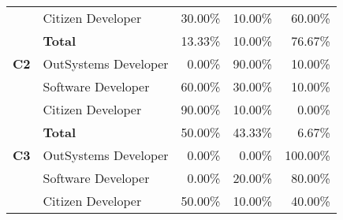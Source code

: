 \begin{table}[tb]
\begin{tabular}{@{}llrrr@{}}
                              & Citizen Developer    & 30.00\%                                                           & 10.00\%                                                                 & 60.00\%                                                       \\
                              & \textbf{Total}       & 13.33\%                                                           & 10.00\%                                                                 & 76.67\%                                                       \\ \midrule
    \textbf{C2}               & OutSystems Developer & 0.00\%                                                            & 90.00\%                                                                 & 10.00\%                                                        \\
                              & Software Developer   & 60.00\%                                                           & 30.00\%                                                                 & 10.00\%                                                       \\
                              & Citizen Developer    & 90.00\%                                                           & 10.00\%                                                                 & 0.00\%                                                        \\
                              & \textbf{Total}       & 50.00\%                                                           & 43.33\%                                                                 & 6.67\%                                                        \\ \midrule
    \textbf{C3}               & OutSystems Developer & 0.00\%                                                            & 0.00\%                                                                  & 100.00\%                                                      \\
                              & Software Developer   & 0.00\%                                                            & 20.00\%                                                                 & 80.00\%                                                       \\
                              & Citizen Developer    & 50.00\%                                                           & 10.00\%                                                                 & 40.00\%                                                       \\

\end{tabular}
\end{table}
